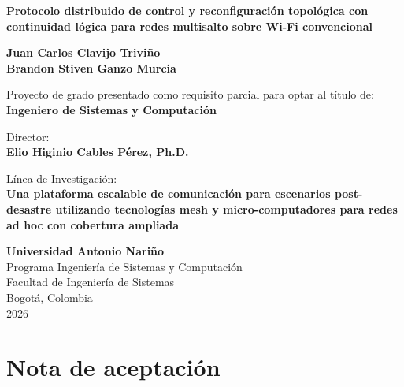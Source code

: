\documentclass[12pt,oneside]{scrreprt}
\begin{document}
\begin{titlepage}
\thispagestyle{headerimage}
\begin{center}

\vspace*{2\baselineskip}

{\textbf{Protocolo distribuido de control y reconfiguración topológica con continuidad lógica para redes multisalto sobre Wi-Fi convencional}}

\vspace{2\baselineskip}

\textbf{Juan Carlos Clavijo Triviño}\\
\textbf{Brandon Stiven Ganzo Murcia}\\

\vspace{1\baselineskip}

Proyecto de grado presentado como requisito parcial para optar al título de:\\
\textbf{Ingeniero de Sistemas y Computación}

\vspace{1\baselineskip}

Director:\\
\textbf{Elio Higinio Cables Pérez, Ph.D.}

\vspace{2\baselineskip}

Línea de Investigación:\\
\textbf{Una plataforma escalable de comunicación para escenarios post-desastre utilizando tecnologías mesh y micro-computadores para redes ad hoc con cobertura ampliada}

\vfill
\textbf{Universidad Antonio Nariño}\\
Programa Ingeniería de Sistemas y Computación\\
Facultad de Ingeniería de Sistemas\\
Bogotá, Colombia\\
2026

\end{center}
\end{titlepage}

\restoregeometry
\clearpage
\pagestyle{empty}
\renewcommand*{\chapterpagestyle}{empty}
\chapter*{Nota de aceptación}
\end{document}
